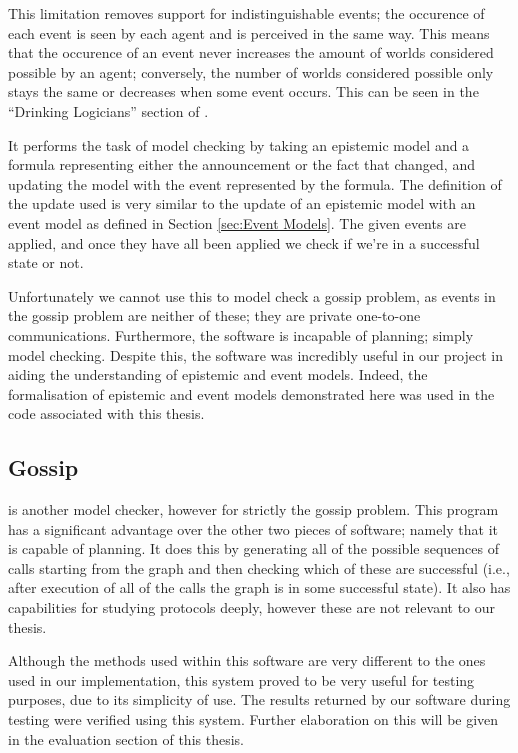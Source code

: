 \documentclass[10pt, a4paper]{report}
\begin{document}
This limitation removes support for indistinguishable events; the occurence of
each event is seen by each agent and is perceived in the same way. This means
that the occurence of an event never increases the amount of worlds considered
possible by an agent; conversely, the number of worlds considered possible only
stays the same or decreases when some event occurs. This can be seen in the
``Drinking Logicians'' section of \cite{DEMO-S5}.

It performs the task of model checking by taking an epistemic model and a
formula representing either the announcement or the fact that changed, and
updating the model with the event represented by the formula. The definition of
the update used is very similar to the update of an epistemic model with an
event model as defined in Section \ref{sec:Event Models}. The given events are
applied, and once they have all been applied we check if we're in a successful
state or not.

Unfortunately we cannot use this to model check a gossip problem, as events in
the gossip problem are neither of these; they are private one-to-one
communications. Furthermore, the software is incapable of planning; simply model
checking. Despite this, the software was incredibly useful in our project in
aiding the understanding of epistemic and event models. Indeed, the
formalisation of epistemic and event models demonstrated here was used in the
code associated with this thesis.

\subsection{Gossip}

\cite{GithubGossip} is another model checker, however for strictly the gossip
problem. This program has a significant advantage over the other two pieces of
software; namely that it is capable of planning. It does this by generating all
of the possible sequences of calls starting from the graph and then checking
which of these are successful (i.e., after execution of all of the calls the
graph is in some successful state). It also has capabilities for studying
protocols deeply, however these are not relevant to our thesis.

Although the methods used within this software are very different to the ones
used in our implementation, this system proved to be very useful for testing
purposes, due to its simplicity of use. The results returned by our software
during testing were verified using this system. Further elaboration on this will
be given in the evaluation section of this thesis.
\end{document}
